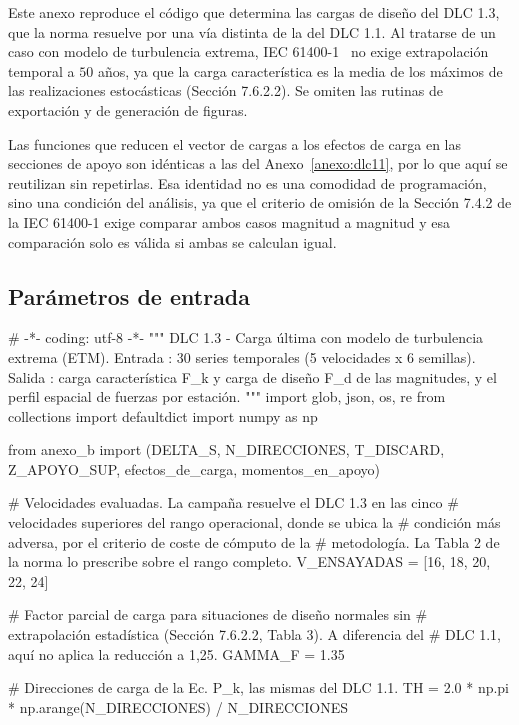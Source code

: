 
Este anexo reproduce el código que determina las cargas de diseño del DLC 1.3, que la norma resuelve por una vía distinta de la del DLC 1.1. Al tratarse de un caso con modelo de turbulencia extrema, IEC 61400-1~\parencite*{IEC61400-1} no exige extrapolación temporal a $50$ años, ya que la carga característica es la media de los máximos de las realizaciones estocásticas (Sección 7.6.2.2). Se omiten las rutinas de exportación y de generación de figuras.

Las funciones que reducen el vector de cargas a los efectos de carga en las secciones de apoyo son idénticas a las del Anexo~\ref{anexo:dlc11}, por lo que aquí se reutilizan sin repetirlas. Esa identidad no es una comodidad de programación, sino una condición del análisis, ya que el criterio de omisión de la Sección 7.4.2 de la IEC 61400-1 exige comparar ambos casos magnitud a magnitud y esa comparación solo es válida si ambas se calculan igual.

\subsection*{Parámetros de entrada}

\begin{pycode}
# -*- coding: utf-8 -*-
"""
DLC 1.3 - Carga última con modelo de turbulencia extrema (ETM).
Entrada : 30 series temporales (5 velocidades x 6 semillas).
Salida  : carga característica F_k y carga de diseño F_d de las
          magnitudes, y el perfil espacial de fuerzas por estación.
"""
import glob, json, os, re
from collections import defaultdict
import numpy as np

from anexo_b import (DELTA_S, N_DIRECCIONES, T_DISCARD, Z_APOYO_SUP,
                     efectos_de_carga, momentos_en_apoyo)

# Velocidades evaluadas. La campaña resuelve el DLC 1.3 en las cinco
# velocidades superiores del rango operacional, donde se ubica la
# condición más adversa, por el criterio de coste de cómputo de la
# metodología. La Tabla 2 de la norma lo prescribe sobre el rango completo.
V_ENSAYADAS = [16, 18, 20, 22, 24]

# Factor parcial de carga para situaciones de diseño normales sin
# extrapolación estadística (Sección 7.6.2.2, Tabla 3). A diferencia del
# DLC 1.1, aquí no aplica la reducción a 1,25.
GAMMA_F = 1.35

# Direcciones de carga de la Ec. P_k, las mismas del DLC 1.1.
TH = 2.0 * np.pi * np.arange(N_DIRECCIONES) / N_DIRECCIONES
\end{pycode}

